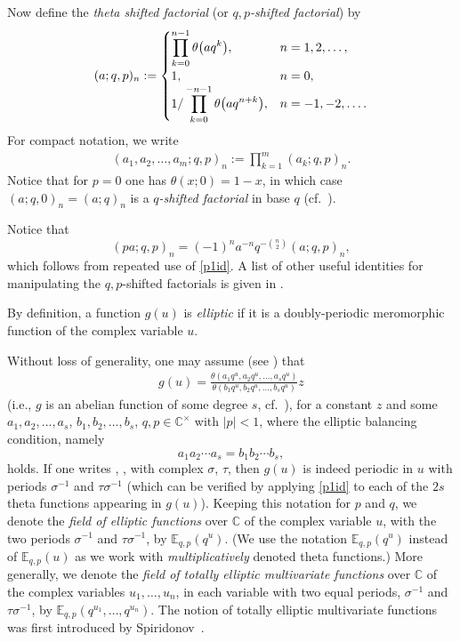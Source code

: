 \documentclass[pdftex]{sigma}
\numberwithin{equation}{section}
\theoremstyle{definition}
\newcommand{\ta}{\theta}
\newcommand{\C}{\mathbb C}
\newcommand{\E}{\mathbb E}
\begin{document}
Now define the {\em theta shifted factorial} (or
{\em $q,p$-shifted factorial}) by
\begin{gather*}
(a;q,p)_n := \begin{cases}
\displaystyle \prod^{n-1}_{k=0} \ta \bigl(aq^k\bigr),& n = 1, 2, \dots,\cr
1,& n = 0,\cr
\displaystyle 1/\prod^{-n-1}_{k=0} \ta \bigl(aq^{n+k}\bigr),& n = -1, -2, \dots.
\end{cases}
\end{gather*}
For compact notation, we write
\begin{gather*}
(a_1, a_2, \dots, a_m;q, p)_n := \prod^m_{k=1} (a_k;q,p)_n.
\end{gather*}
Notice that for $p=0$ one has $\ta (x;0) = 1-x$,
in which case $(a;q, 0)_n = (a;q)_n$
is a {\em $q$-shifted factorial} in base $q$ (cf.\ \cite{GR}).

Notice that
\[
(pa;q,p)_n=(-1)^na^{-n}q^{-\binom n2} (a;q,p)_n,
\]
which follows from repeated use of \eqref{p1id}.
A list of other useful identities for manipulating the
$q,p$-shifted factorials is given in \cite[Section~11.2]{GR}.

By definition, a function $g(u)$ is {\em elliptic} if it is
a doubly-periodic meromorphic function of the complex variable $u$.

Without loss of generality, one may assume
(see \cite[Theorem~1.3.3]{R21}) that
\begin{gather*}
g(u)=\frac{\ta(a_1q^u,a_2q^u,\dots,a_sq^u)}
{\ta(b_1q^u,b_2q^u,\dots,b_sq^u)} z
\end{gather*}
(i.e., $g$ is an abelian function of some degree $s$,
cf.\ \cite{Ba}),
for a constant $z$ and some
$a_1,a_2,\dots,a_s$, $b_1,b_2,\dots,b_s$, $q,p\in\C^\times$ with $|p|<1$,
where the elliptic balancing condition, namely
\[
a_1a_2\cdots a_s=b_1b_2\cdots b_s,\]
holds. If one writes , ,
with complex $\sigma$, $\tau$, then $g(u)$ is indeed periodic in $u$
with periods $\sigma^{-1}$ and $\tau\sigma^{-1}$
(which can be verified by applying \eqref{p1id} to each of the $2s$
theta functions appearing in $g(u)$).
Keeping this notation for $p$ and $q$, we denote the {\em field
of elliptic functions} over $\C$ of the complex variable $u$,
with the two periods $\sigma^{-1}$ and
$\tau\sigma^{-1}$, by $\E_{q,p}(q^u)$.
(We use the notation $\E_{q,p}(q^u)$ instead of
$\E_{q,p}(u)$ as we work with \textit{multiplicatively} denoted
theta functions.)
More generally, we denote the {\em field of totally elliptic multivariate
functions} over $\C$ of the complex variables $u_1,\dots,u_n$,
in each variable with two equal periods,
$\sigma^{-1}$ and $\tau\sigma^{-1}$, by
$\E_{q,p}(q^{u_1},\dots,q^{u_n})$.
The notion of totally elliptic multivariate functions
was first introduced by Spiridonov~\mbox{\cite{Sp02,Sp11}}.
\end{document}
